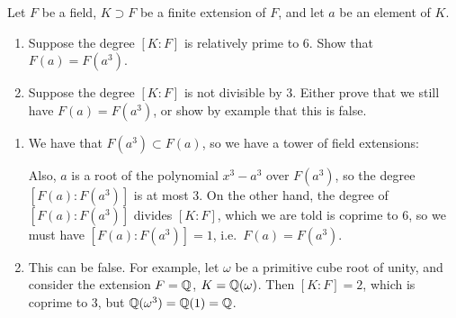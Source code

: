 %
\begin{question}[subtitle = January 2025 Problem 3,ID=Jan25_3]
Let $F$ be a field, $K \supset F$ be a finite extension of $F$, and let $a$ be an element of $K$.
\begin{enumerate}
    \item Suppose the degree $[K:F]$ is relatively prime to 6. Show that $F(a) = F(a^3)$.
    \item Suppose the degree $[K:F]$ is not divisible by 3. Either prove that we still have $F(a) = F(a^3)$, or show by example that this is false.
\end{enumerate}
\end{question}
\begin{solution}
\begin{enumerate}
    \item We have that $F(a^3) \subset F(a)$, so we have a tower of field extensions:
    \begin{center}
    \end{center}
    Also, $a$ is a root of the polynomial $x^3 - a^3$ over $F(a^3)$, so the degree $[F(a):F(a^3)]$ is at most 3. On the other hand, the degree of $[F(a):F(a^3)]$ divides $[K:F]$, which we are told is coprime to 6, so we must have $[F(a):F(a^3)] = 1$, i.e.\ $F(a) = F(a^3)$.
    \item This can be false. For example, let $\omega$ be a primitive cube root of unity, and consider the extension $F = \mathbb{Q}$, $K = \mathbb{Q}(\omega)$. Then $[K:F] = 2$, which is coprime to 3, but $\mathbb{Q}(\omega^3) = \mathbb{Q}(1) = \mathbb{Q}$.
\end{enumerate}
\end{solution}

